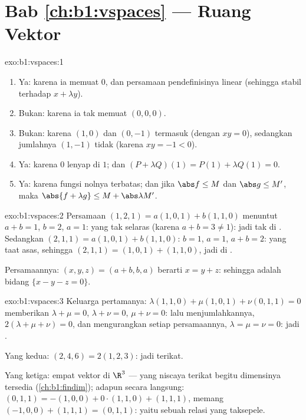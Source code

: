 \section*{Bab \ref{ch:b1:vspaces} --- Ruang Vektor}

\begin{solution}{exo:b1:vspaces:1}
\begin{enumerate}
  \item Ya: karena ia memuat $0$, dan persamaan pendefinisinya linear
        (sehingga stabil terhadap $x + \lambda y$).
  \item Bukan: karena ia tak memuat $(0,0,0)$.
  \item Bukan: karena $(1, 0)$ dan $(0, -1)$ termasuk (dengan $xy = 0$), sedangkan jumlahnya $(1,
        -1)$ tidak (karena $xy = -1 < 0$).
  \item Ya: karena $0$ lenyap di $1$; dan $(P + \lambda Q)(1) = P(1) +
        \lambda Q(1) = 0$.
  \item Ya: karena fungsi nolnya terbatas; dan jika $\abs f \leq M$ dan
        $\abs g \leq M'$, maka $\abs{f + \lambda g} \leq M +
        \abs\lambda M'$.
\end{enumerate}
\end{solution}

\begin{solution}{exo:b1:vspaces:2}
Persamaan $(1,2,1) = a(1,0,1) + b(1,1,0)$ menuntut $a + b = 1$, $b = 2$, $a =
1$: yang tak selaras (karena $a + b = 3 \neq 1$): jadi tak di . Sedangkan $(2,1,1) =
a(1,0,1) + b(1,1,0)$: $b = 1$, $a = 1$, $a + b = 2$: yang taat asas, sehingga
$(2,1,1) = (1,0,1) + (1,1,0)$, jadi di .

Persamaannya: $(x, y, z) = (a + b, b, a)$ berarti $x = y + z$: sehingga 
adalah bidang $\{x - y - z = 0\}$.
\end{solution}

\begin{solution}{exo:b1:vspaces:3}
Keluarga pertamanya: $\lambda(1,1,0) + \mu(1,0,1) + \nu(0,1,1) = 0$ memberikan
$\lambda + \mu = 0$, $\lambda + \nu = 0$, $\mu + \nu = 0$: lalu menjumlahkannya,
$2(\lambda + \mu + \nu) = 0$, dan mengurangkan setiap persamaannya,
$\lambda = \mu = \nu = 0$: jadi .

Yang kedua: $(2,4,6) = 2(1,2,3)$: jadi terikat.

Yang ketiga: empat vektor di $\R^3$ --- yang niscaya terikat begitu dimensinya
tersedia (\cref{ch:b1:findim}); adapun secara langsung: $(0,1,1) = -(1,0,0) +
0\cdot(1,1,0) + (1,1,1)$, memang $(-1,0,0) + (1,1,1) = (0,1,1)$: yaitu sebuah
relasi yang taksepele.
\end{solution}

